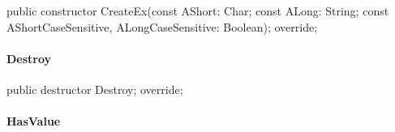 \documentclass{report}
\newif\ifpdf
\begin{document}
\label{PasDoc_OptionParser.TSetOption-CreateEx}
\begin{list}{}{
\setlength{\itemindent}{0cm}
\setlength{\listparindent}{0cm}
\setlength{\leftmargin}{\evensidemargin}
\addtolength{\leftmargin}{\tmplength}
\settowidth{\labelsep}{X}
\addtolength{\leftmargin}{\labelsep}
\setlength{\labelwidth}{\tmplength}
}
\item[\textbf{Declaration}\hfill]
\ifpdf
\begin{flushleft}
\fi
\begin{ttfamily}
public constructor CreateEx(const AShort: Char; const ALong: String; const AShortCaseSensitive, ALongCaseSensitive: Boolean); override;\end{ttfamily}

\ifpdf
\end{flushleft}
\fi

\end{list}
\paragraph*{Destroy}\hspace*{\fill}

\label{PasDoc_OptionParser.TSetOption-Destroy}
\begin{list}{}{
\setlength{\itemindent}{0cm}
\setlength{\listparindent}{0cm}
\setlength{\leftmargin}{\evensidemargin}
\addtolength{\leftmargin}{\tmplength}
\settowidth{\labelsep}{X}
\addtolength{\leftmargin}{\labelsep}
\setlength{\labelwidth}{\tmplength}
}
\item[\textbf{Declaration}\hfill]
\ifpdf
\begin{flushleft}
\fi
\begin{ttfamily}
public destructor Destroy; override;\end{ttfamily}

\ifpdf
\end{flushleft}
\fi

\end{list}
\paragraph*{HasValue}\hspace*{\fill}
\end{document}
